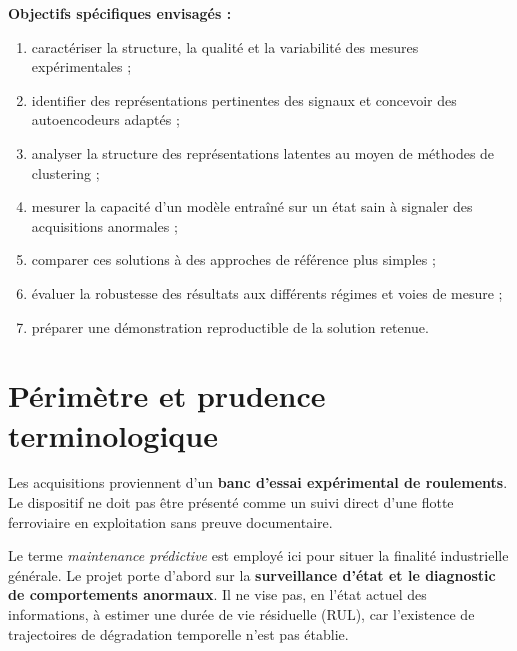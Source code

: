 \textbf{Objectifs spécifiques envisagés :}
\begin{enumerate}
  \item caractériser la structure, la qualité et la variabilité des mesures expérimentales ;
  \item identifier des représentations pertinentes des signaux et concevoir des autoencodeurs adaptés ;
  \item analyser la structure des représentations latentes au moyen de méthodes de clustering ;
  \item mesurer la capacité d'un modèle entraîné sur un état sain à signaler des acquisitions anormales ;
  \item comparer ces solutions à des approches de référence plus simples ;
  \item évaluer la robustesse des résultats aux différents régimes et voies de mesure ;
  \item préparer une démonstration reproductible de la solution retenue.
\end{enumerate}

\section{Périmètre et prudence terminologique}
Les acquisitions proviennent d'un \textbf{banc d'essai expérimental de roulements}. Le dispositif ne doit pas être présenté comme un suivi direct d'une flotte ferroviaire en exploitation sans preuve documentaire.

Le terme \emph{maintenance prédictive} est employé ici pour situer la finalité industrielle générale. Le projet porte d'abord sur la \textbf{surveillance d'état et le diagnostic de comportements anormaux}. Il ne vise pas, en l'état actuel des informations, à estimer une durée de vie résiduelle (RUL), car l'existence de trajectoires de dégradation temporelle n'est pas établie.
